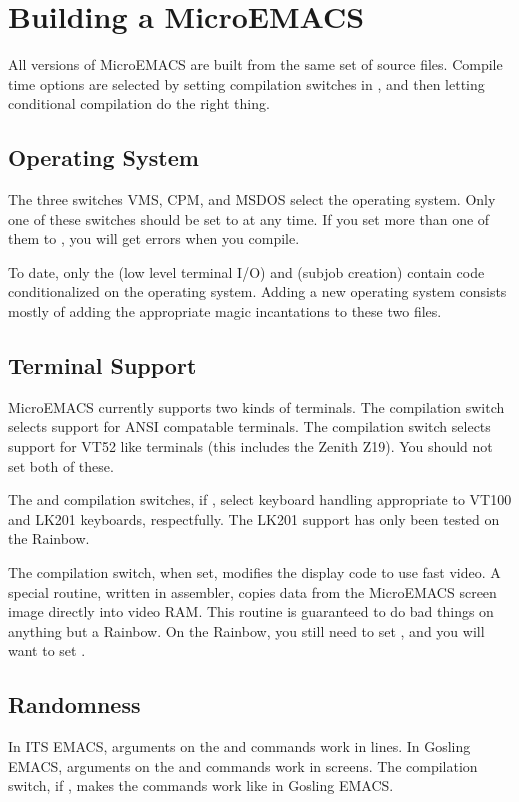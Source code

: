 \section{Building a MicroEMACS}
All versions of MicroEMACS are built from the same set of
source files. Compile time options are selected by setting compilation
switches in , and then letting conditional compilation do the
right thing.
\subsection{Operating System}
The three switches VMS, CPM, and MSDOS select the operating system.
Only one of these switches should be set to  at any time. If you set
more than one of them to , you will get errors when you compile.

To date, only the  (low level terminal I/O) and 
(subjob creation) contain code conditionalized on the operating system.
Adding a new operating system consists mostly of adding the appropriate
magic incantations to these two files.
\subsection{Terminal Support}
MicroEMACS currently supports two kinds of terminals. The 
compilation switch selects support for ANSI compatable terminals. The
 compilation switch selects support for VT52 like terminals (this
includes the Zenith Z19). You should not set both of these.

The  and  compilation switches,
if , select keyboard
handling appropriate to VT100 and LK201 keyboards, respectfully. The
LK201 support has only been tested on the Rainbow.

The  compilation switch, when set, modifies the display
code to use fast video.
A special routine, written in assembler, copies data from the MicroEMACS
screen image directly into video RAM. This routine is guaranteed to
do bad things on anything but a Rainbow. On the Rainbow, you still need
to set , and you will want to set .
\subsection{Randomness}
In ITS EMACS, arguments on the 
and  commands work in lines. In
Gosling EMACS, arguments on the 
and  commands work in screens.
The  compilation switch, if , makes the commands work
like in Gosling EMACS.

